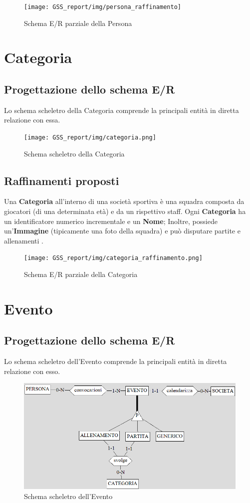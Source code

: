 \documentclass[a4paper,12pt]{report}
\begin{document}
\begin{figure}[htp]
    \centering
    \texttt{[image: GSS\_report/img/persona\_raffinamento]}
    \caption{Schema E/R parziale della Persona}
\end{figure}

\newpage
\section{Categoria}
\subsection{Progettazione dello schema E/R}
Lo schema scheletro della Categoria comprende la principali entità in diretta relazione con essa.
\begin{figure}[htp]
    \centering
    \texttt{[image: GSS\_report/img/categoria.png]}
    \caption{Schema scheletro della Categoria}
\end{figure}
\subsection{Raffinamenti proposti}

Una \textbf{Categoria} all'interno di una società sportiva è una squadra composta da giocatori (di una determinata età) e da un rispettivo staff.
Ogni \textbf{Categoria} ha un identificatore numerico incrementale e un \textbf{Nome}; Inoltre, possiede un'\textbf{Immagine} (tipicamente una foto della squadra) e può disputare partite e allenamenti .

\begin{figure}[htp]
    \centering
    \texttt{[image: GSS\_report/img/categoria\_raffinamento.png]}
    \caption{Schema E/R parziale della Categoria}
\end{figure}

\newpage
\section{Evento}
\subsection{Progettazione dello schema E/R}
Lo schema scheletro dell'Evento comprende la principali entità in diretta relazione con esso.
\begin{figure}[htp]
    \centering
    \includegraphics[width = \textwidth]{GSS_report/img/evento.png}
    \caption{Schema scheletro dell'Evento}
\end{figure}
\end{document}
